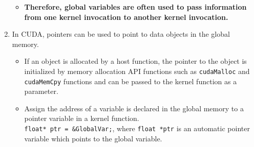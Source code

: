 \begin{enumerate}
\begin{itemize}
              \item \textbf{Therefore, global variables are often used to pass information from one kernel invocation to another kernel invocation.}
          \end{itemize}
    \item In CUDA, pointers can be used to point to data objects in the global memory.
          \begin{itemize}
              \item If an object is allocated by a host function, the pointer to the object is initialized by memory allocation API functions such as \texttt{cudaMalloc} and \texttt{cudaMemCpy} functions and can be passed to the kernel function as a parameter.
              \item Assign the address of a  variable is declared in the global memory to a pointer variable in a kernel function.\\
                    \texttt{float* ptr = \&GlobalVar;}, where \texttt{float *ptr} is an automatic pointer variable which points to the global variable.
          \end{itemize}
\end{enumerate}

\pagebreak
